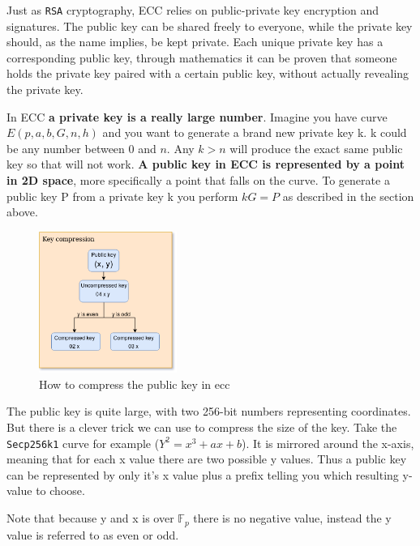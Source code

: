 Just as \texttt{RSA} cryptography, ECC relies on public-private key encryption and signatures. The public key can be shared freely to everyone, while the private key should, as the name implies, be kept private. Each unique private key has a corresponding public key, through mathematics it can be proven that someone holds the private key paired with a certain public key, without actually revealing the private key. 

In ECC \textbf{a private key is a really large number}. Imagine you have curve $E(p,a,b,G,n,h)$ and you want to generate a brand new private key k. k could be any number between 0 and $n$. Any $k > n$ will produce the exact same public key so that will not work. \textbf{A public key in ECC is represented by a point in 2D space}, more specifically a point that falls on the curve. To generate a public key P from a private key k you perform $kG = P$ as described in the section above.

\begin{figure}
	\begin{center}
		\includegraphics[width=0.4\textwidth]{background/images/key_compression.png}
	\end{center}
	\vspace{-8mm}
	\caption{How to compress the public key in ecc}
\end{figure}

The public key is quite large, with two 256-bit numbers representing coordinates. But there is a clever trick we can use to compress the size of the key. Take the \texttt{Secp256k1} curve for example ($Y^2=x^3+ax+b$). It is mirrored around the x-axis, meaning that for each x value there are two possible y values. Thus a public key can be represented by only it's x value plus a prefix telling you which resulting y-value to choose. 

Note that because y and x is over $\mathbb{F}_{p}$ there is no negative value, instead the y value is referred to as even or odd. 

